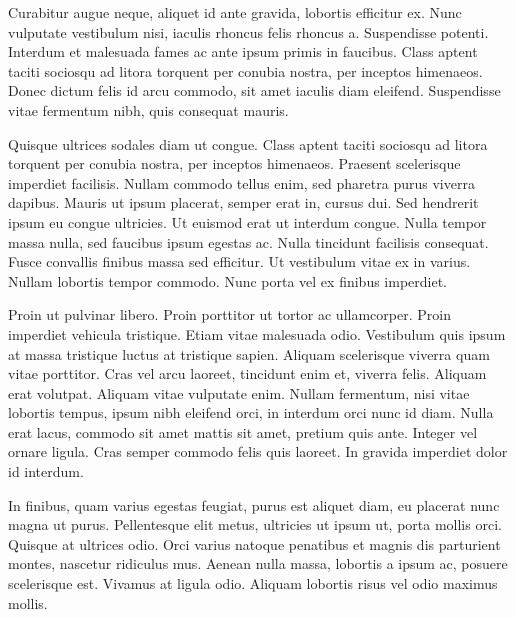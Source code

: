 Curabitur augue neque, aliquet id ante gravida, lobortis efficitur ex. Nunc vulputate vestibulum nisi, iaculis rhoncus felis rhoncus a. Suspendisse potenti. Interdum et malesuada fames ac ante ipsum primis in faucibus. Class aptent taciti sociosqu ad litora torquent per conubia nostra, per inceptos himenaeos. Donec dictum felis id arcu commodo, sit amet iaculis diam eleifend. Suspendisse vitae fermentum nibh, quis consequat mauris.

Quisque ultrices sodales diam ut congue. Class aptent taciti sociosqu ad litora torquent per conubia nostra, per inceptos himenaeos. Praesent scelerisque imperdiet facilisis. Nullam commodo tellus enim, sed pharetra purus viverra dapibus. Mauris ut ipsum placerat, semper erat in, cursus dui. Sed hendrerit ipsum eu congue ultricies. Ut euismod erat ut interdum congue. Nulla tempor massa nulla, sed faucibus ipsum egestas ac. Nulla tincidunt facilisis consequat. Fusce convallis finibus massa sed efficitur. Ut vestibulum vitae ex in varius. Nullam lobortis tempor commodo. Nunc porta vel ex finibus imperdiet.

Proin ut pulvinar libero. Proin porttitor ut tortor ac ullamcorper. Proin imperdiet vehicula tristique. Etiam vitae malesuada odio. Vestibulum quis ipsum at massa tristique luctus at tristique sapien. Aliquam scelerisque viverra quam vitae porttitor. Cras vel arcu laoreet, tincidunt enim et, viverra felis. Aliquam erat volutpat. Aliquam vitae vulputate enim. Nullam fermentum, nisi vitae lobortis tempus, ipsum nibh eleifend orci, in interdum orci nunc id diam. Nulla erat lacus, commodo sit amet mattis sit amet, pretium quis ante. Integer vel ornare ligula. Cras semper commodo felis quis laoreet. In gravida imperdiet dolor id interdum.

In finibus, quam varius egestas feugiat, purus est aliquet diam, eu placerat nunc magna ut purus. Pellentesque elit metus, ultricies ut ipsum ut, porta mollis orci. Quisque at ultrices odio. Orci varius natoque penatibus et magnis dis parturient montes, nascetur ridiculus mus. Aenean nulla massa, lobortis a ipsum ac, posuere scelerisque est. Vivamus at ligula odio. Aliquam lobortis risus vel odio maximus mollis.
